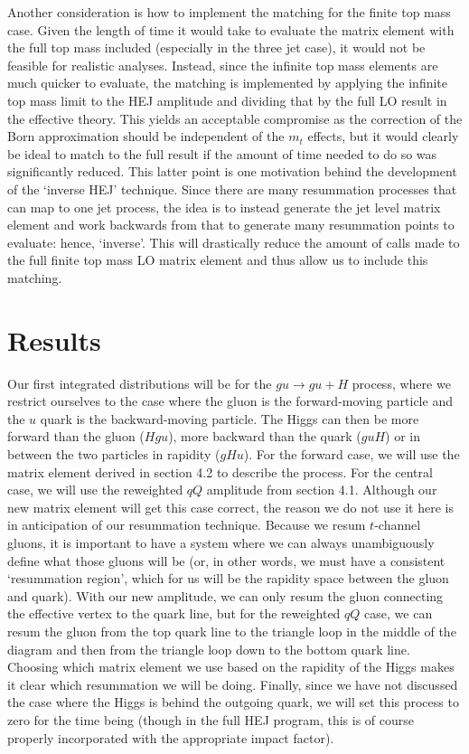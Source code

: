 Another consideration is how to implement the matching for the finite top mass case. Given the length of time it would take to evaluate the matrix element with the full top mass included (especially in the three jet case), it would not be feasible for realistic analyses. Instead, since the infinite top mass elements are much quicker to evaluate, the matching is implemented by applying the infinite top mass limit to the HEJ amplitude and dividing that by the full LO result in the effective theory. This yields an acceptable compromise as the correction of the Born approximation should be independent of the $m_t$ effects, but it would clearly be ideal to match to the full result if the amount of time needed to do so was significantly reduced. This latter point is one motivation behind the development of the `inverse HEJ' technique. Since there are many resummation processes that can map to one jet process, the idea is to instead generate the jet level matrix element and work backwards from that to generate many resummation points to evaluate: hence, `inverse'. This will drastically reduce the amount of calls made to the full finite top mass LO matrix element and thus allow us to include this matching. 

\section{Results}

Our first integrated distributions will be for the $gu \to gu + H$ process, where we restrict ourselves to the case where the gluon is the forward-moving particle and the $u$ quark is the backward-moving particle. The Higgs can then be more forward than the gluon ($Hgu$), more backward than the quark ($guH$) or in between the two particles in rapidity ($gHu$). For the forward case, we will use the matrix element derived in section 4.2 to describe the process. For the central case, we will use the reweighted $qQ$ amplitude from section 4.1. Although our new matrix element will get this case correct, the reason we do not use it here is in anticipation of our resummation technique. Because we resum $t$-channel gluons, it is important to have a system where we can always unambiguously define what those gluons will be (or, in other words, we must have a consistent `resummation region', which for us will be the rapidity space between the gluon and quark). With our new amplitude, we can only resum the gluon connecting the effective vertex to the quark line, but for the reweighted $qQ$ case, we can resum the gluon from the top quark line to the triangle loop in the middle of the diagram and then from the triangle loop down to the bottom quark line. Choosing which matrix element we use based on the rapidity of the Higgs makes it clear which resummation we will be doing. Finally, since we have not discussed the case where the Higgs is behind the outgoing quark, we will set this process to zero for the time being (though in the full HEJ program, this is of course properly incorporated with the appropriate impact factor). %

